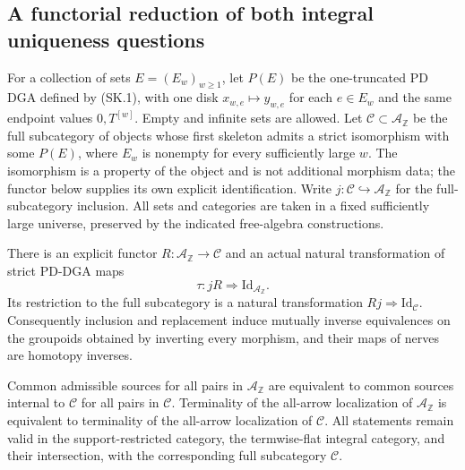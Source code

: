 \subsection{A functorial reduction of both integral uniqueness questions}

For a collection of sets $E=(E_w)_{w\geq1}$, let $P(E)$ be the
one-truncated PD DGA defined by (SK.1), with one disk
$x_{w,e}\mapsto y_{w,e}$ for each $e\in E_w$ and the same
endpoint values $0,T^{[w]}$. Empty and infinite sets are allowed.
Let $\mathcal C\subset\mathcal A_{\mathbb Z}$ be the full
subcategory of objects whose first skeleton admits a strict
isomorphism with some $P(E)$, where $E_w$ is nonempty
for every sufficiently large $w$.
The isomorphism is a property of the object and is not additional
morphism data; the functor below supplies its own explicit
identification. Write $j:\mathcal C\hookrightarrow\mathcal A_{\mathbb Z}$
for the full-subcategory inclusion.
All sets and categories are taken in a fixed sufficiently large
universe, preserved by the indicated free-algebra constructions.

\begin{theorem}
\label{A006}
There is an explicit functor
$R:\mathcal A_{\mathbb Z}\to\mathcal C$ and an actual natural
transformation of strict PD-DGA maps
\[
                         \tau:jR\Longrightarrow
                                   \mathrm{Id}_{\mathcal A_{\mathbb Z}}.
 \tag{SK.15}
\]
Its restriction to the full subcategory is a natural transformation
$Rj\Rightarrow\mathrm{Id}_{\mathcal C}$.
Consequently inclusion and replacement induce mutually inverse
equivalences on the groupoids obtained by inverting every morphism,
and their maps of nerves are homotopy inverses.

Common admissible sources for all pairs in $\mathcal A_{\mathbb Z}$
are equivalent to common sources internal to $\mathcal C$ for all
pairs in $\mathcal C$.
Terminality of the all-arrow localization of
$\mathcal A_{\mathbb Z}$ is equivalent to terminality of the
all-arrow localization of $\mathcal C$.
All statements remain valid in the support-restricted category,
the termwise-flat integral category, and their intersection,
with the corresponding full subcategory $\mathcal C$.
\end{theorem}

